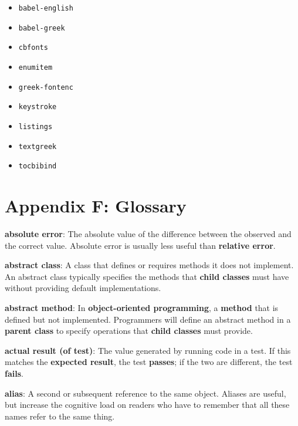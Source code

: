 \documentclass{scrbook}
\newcommand{\glosskey}[1]{\textbf{#1}}
\begin{document}
\begin{itemize}

\item \texttt{babel-english}

\item \texttt{babel-greek}

\item \texttt{cbfonts}

\item \texttt{enumitem}

\item \texttt{greek-fontenc}

\item \texttt{keystroke}

\item \texttt{listings}

\item \texttt{textgreek}

\item \texttt{tocbibind}

\end{itemize}

\chapter{Appendix F: Glossary}\label{glossary}



\noindent \textbf{\glosskey{absolute error}}: 
The absolute value of the difference between the observed and the correct value. Absolute error is usually less useful than \glosskey{relative error}.


\noindent \textbf{\glosskey{abstract class}}: 
A class that defines or requires methods it does not implement. An abstract class typically specifies the methods that \glosskey{child classes} must have without providing default implementations.


\noindent \textbf{\glosskey{abstract method}}: 
In \glosskey{object-oriented programming}, a \glosskey{method} that is defined but not implemented. Programmers will define an abstract method in a \glosskey{parent class} to specify operations that \glosskey{child classes} must provide.


\noindent \textbf{\glosskey{actual result (of test)}}: 
The value generated by running code in a test. If this matches the \glosskey{expected result}, the test \glosskey{passes}; if the two are different, the test \glosskey{fails}.


\noindent \textbf{\glosskey{alias}}: 
A second or subsequent reference to the same object. Aliases are useful, but increase the cognitive load on readers who have to remember that all these names refer to the same thing.
\end{document}
